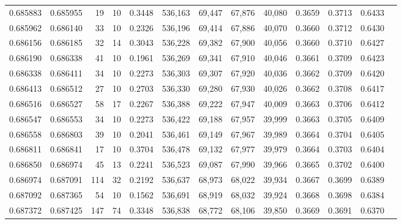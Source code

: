 \begin{tabular}{rrrrrrrrrrrrr}
0.685883 & 0.685955 &    19 &  10 &                                     0.3448 & 536,163 &  69,447 &  67,876 &  40,080 & 0.3659 & 0.3713 & 0.6433 \\
0.685962 & 0.686140 &    33 &  10 &                                     0.2326 & 536,196 &  69,414 &  67,886 &  40,070 & 0.3660 & 0.3712 & 0.6430 \\
0.686156 & 0.686185 &    32 &  14 &                                     0.3043 & 536,228 &  69,382 &  67,900 &  40,056 & 0.3660 & 0.3710 & 0.6427 \\
0.686190 & 0.686338 &    41 &  10 &                                     0.1961 & 536,269 &  69,341 &  67,910 &  40,046 & 0.3661 & 0.3709 & 0.6423 \\
0.686338 & 0.686411 &    34 &  10 &                                     0.2273 & 536,303 &  69,307 &  67,920 &  40,036 & 0.3662 & 0.3709 & 0.6420 \\
0.686413 & 0.686512 &    27 &  10 &                                     0.2703 & 536,330 &  69,280 &  67,930 &  40,026 & 0.3662 & 0.3708 & 0.6417 \\
0.686516 & 0.686527 &    58 &  17 &                                     0.2267 & 536,388 &  69,222 &  67,947 &  40,009 & 0.3663 & 0.3706 & 0.6412 \\
0.686547 & 0.686553 &    34 &  10 &                                     0.2273 & 536,422 &  69,188 &  67,957 &  39,999 & 0.3663 & 0.3705 & 0.6409 \\
0.686558 & 0.686803 &    39 &  10 &                                     0.2041 & 536,461 &  69,149 &  67,967 &  39,989 & 0.3664 & 0.3704 & 0.6405 \\
0.686811 & 0.686841 &    17 &  10 &                                     0.3704 & 536,478 &  69,132 &  67,977 &  39,979 & 0.3664 & 0.3703 & 0.6404 \\
0.686850 & 0.686974 &    45 &  13 &                                     0.2241 & 536,523 &  69,087 &  67,990 &  39,966 & 0.3665 & 0.3702 & 0.6400 \\
0.686974 & 0.687091 &   114 &  32 &                                     0.2192 & 536,637 &  68,973 &  68,022 &  39,934 & 0.3667 & 0.3699 & 0.6389 \\
0.687092 & 0.687365 &    54 &  10 &                                     0.1562 & 536,691 &  68,919 &  68,032 &  39,924 & 0.3668 & 0.3698 & 0.6384 \\
0.687372 & 0.687425 &   147 &  74 &                                     0.3348 & 536,838 &  68,772 &  68,106 &  39,850 & 0.3669 & 0.3691 & 0.6370 \\

\end{tabular}

